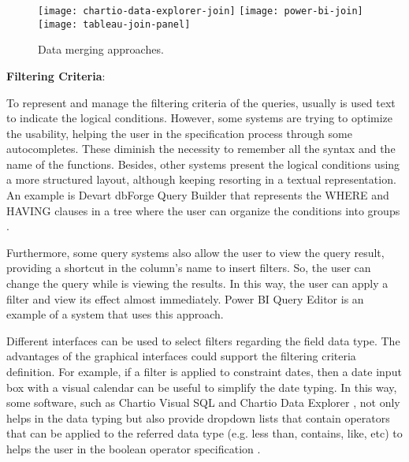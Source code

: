 \begin{figure}[htbp]
    \centering
      {\texttt{[image: chartio-data-explorer-join]}}%
    {\texttt{[image: power-bi-join]}}%
    \\
      {\texttt{[image: tableau-join-panel]}}%
  \caption{Data merging approaches.}
    \label{fig:approaches_select_data_sources}
\end{figure}

\textbf{Filtering Criteria}: 

To represent and manage the filtering criteria of the queries, usually is used text to indicate the logical conditions. However, some systems are trying to optimize the usability, helping the user in the specification process through some autocompletes. These diminish the necessity to remember all the syntax and the name of the functions. 
Besides, other systems present the logical conditions using a more structured layout, although keeping resorting in a textual representation. An example is Devart dbForge Query Builder \cite{dbForgeQueryBuilder} that represents the WHERE and HAVING clauses in a tree where the user can organize the conditions into groups \cite{dbForgeBuildingWhereOrHavingClause}.

Furthermore, some query systems also allow the user to view the query result, providing a shortcut in the column's name to insert filters. So, the user can change the query while is viewing the results. In this way, the user can apply a filter and view its effect almost immediately. Power BI Query Editor \cite{powerBI} is an example of a system that uses this approach.

Different interfaces can be used to select filters regarding the field data type. The advantages of the graphical interfaces could support the filtering criteria definition. For example, if a filter is applied to constraint dates, then a date input box with a visual calendar can be useful to simplify the date typing. In this way, some software, such as Chartio Visual SQL \cite{chartioVisualSQL} and Chartio Data Explorer \cite{chartioDataExplorer}, not only helps in the data typing but also provide dropdown lists that contain operators that can be applied to the referred data type (e.g. less than, contains, like, etc)  to helps the user in the boolean operator specification \cite{chartioDataExplorer}  \cite{visualSqlActions}.

